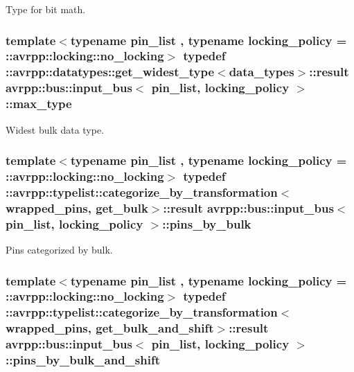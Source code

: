 Type for bit math. 

\hypertarget{structavrpp_1_1bus_1_1input__bus_adb5d93a3e6b52dc72ad270be2d49e8be}{
\subsubsection[{max\_\-type}]{\setlength{\rightskip}{0pt plus 5cm}template$<$typename pin\_\-list , typename locking\_\-policy  = ::avrpp::locking::no\_\-locking$>$ typedef ::avrpp::datatypes::get\_\-widest\_\-type$<${\bf data\_\-types}$>$::result {\bf avrpp::bus::input\_\-bus}$<$ pin\_\-list, locking\_\-policy $>$::{\bf max\_\-type}}}
\label{structavrpp_1_1bus_1_1input__bus_adb5d93a3e6b52dc72ad270be2d49e8be}


Widest bulk data type. 

\hypertarget{structavrpp_1_1bus_1_1input__bus_afa02571f7cf5fd65f26332cf2b7a51e3}{
\subsubsection[{pins\_\-by\_\-bulk}]{\setlength{\rightskip}{0pt plus 5cm}template$<$typename pin\_\-list , typename locking\_\-policy  = ::avrpp::locking::no\_\-locking$>$ typedef ::avrpp::typelist::categorize\_\-by\_\-transformation$<${\bf wrapped\_\-pins}, {\bf get\_\-bulk}$>$::result {\bf avrpp::bus::input\_\-bus}$<$ pin\_\-list, locking\_\-policy $>$::{\bf pins\_\-by\_\-bulk}}}
\label{structavrpp_1_1bus_1_1input__bus_afa02571f7cf5fd65f26332cf2b7a51e3}


Pins categorized by bulk. 

\hypertarget{structavrpp_1_1bus_1_1input__bus_a3629efb5413d267c3a8ce7d5391b2c2c}{
\subsubsection[{pins\_\-by\_\-bulk\_\-and\_\-shift}]{\setlength{\rightskip}{0pt plus 5cm}template$<$typename pin\_\-list , typename locking\_\-policy  = ::avrpp::locking::no\_\-locking$>$ typedef ::avrpp::typelist::categorize\_\-by\_\-transformation$<${\bf wrapped\_\-pins}, {\bf get\_\-bulk\_\-and\_\-shift}$>$::result {\bf avrpp::bus::input\_\-bus}$<$ pin\_\-list, locking\_\-policy $>$::{\bf pins\_\-by\_\-bulk\_\-and\_\-shift}}}
\label{structavrpp_1_1bus_1_1input__bus_a3629efb5413d267c3a8ce7d5391b2c2c}


